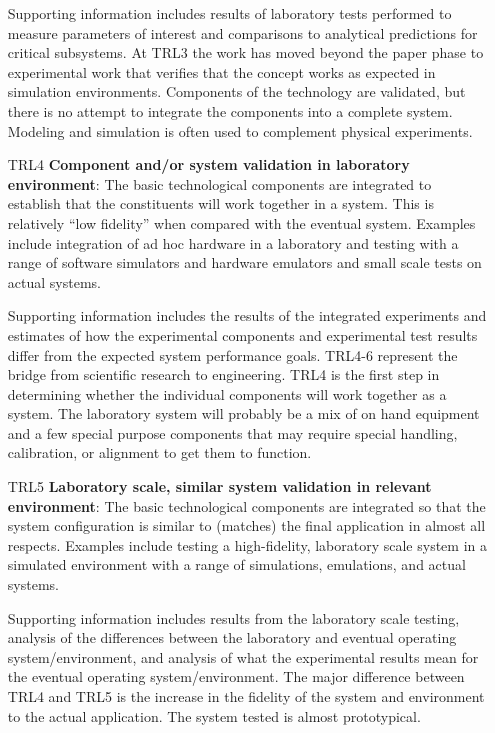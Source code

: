 \begin{enumerate}
    Supporting information includes results of laboratory tests performed to measure parameters of interest and comparisons to analytical predictions for critical subsystems. At TRL3 the work has moved beyond the paper phase to experimental work that verifies that the concept works as expected in simulation environments. Components of the technology are validated, but there is no attempt to integrate the components into a complete system. Modeling and simulation is often used to complement physical experiments.
    
    \item[\footnotesize TRL4] \textbf{Component and/or system validation in laboratory environment}: The basic technological components are integrated to establish that the constituents will work together in a system. This is relatively ``low fidelity'' when compared with the eventual system. Examples include integration of ad hoc hardware in a laboratory and testing with a range of software simulators and hardware emulators and small scale tests on actual systems. 
    
    Supporting information includes the results of the integrated experiments and estimates of how the experimental components and experimental test results differ from the expected system performance goals. TRL4-6 represent the bridge from scientific research to engineering. TRL4 is the first step in determining whether the individual components will work together as a system. The laboratory system will probably be a mix of on hand equipment and a few special purpose components that may require special handling, calibration, or alignment to get them to function.
    
    \item[\footnotesize TRL5] \textbf{Laboratory scale, similar system validation in relevant environment}: The basic technological components are integrated so that the system configuration is similar to (matches) the final application in almost all respects. Examples include testing a high-fidelity, laboratory scale system in a simulated environment with a range of simulations, emulations, and actual systems. 
    
    Supporting information includes results from the laboratory scale testing, analysis of the differences between the laboratory and eventual operating system/environment, and analysis of what the experimental results mean for the eventual operating system/environment. The major difference between TRL4 and TRL5 is the increase in the fidelity of the system and environment to the actual application. The system tested is almost prototypical.
    

\end{enumerate}
